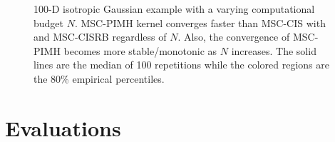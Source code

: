 
\begin{figure}
  \centering
  \caption{100-D isotropic Gaussian example with a varying computational budget \(N\).
    MSC-PIMH kernel converges faster than MSC-CIS with and MSC-CISRB regardless of \(N\).
    Also, the convergence of MSC-PIMH becomes more stable/monotonic as \(N\) increases.
    The solid lines are the median of 100 repetitions while the colored regions are the 80\% empirical percentiles.
  }\label{fig:gaussian}
\end{figure}

\section{Evaluations}\label{section:eval}
